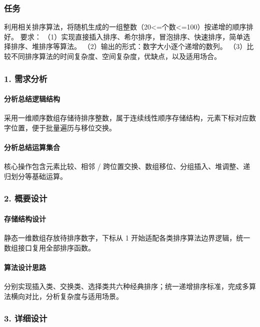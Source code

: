 \documentclass{ctexart}
\begin{document}
\subsubsection {任务}
利用相关排序算法，将随机生成的一组整数（20<=个数<=100）按递增的顺序排好。 要求： （1）实现直接插入排序、希尔排序，冒泡排序、快速排序，简单选择排序、堆排序等算法。 （2）输出的形式：数字大小逐个递增的数列。 （3）比较不同排序算法的时间复杂度、空间复杂度，优缺点，以及适用场合。
\subsubsection{1. 需求分析}
\paragraph{分析总结逻辑结构}
采用一维顺序数组存储待排序整数，属于连续线性顺序存储结构，元素下标对应数字位置，便于批量遍历与移位交换。
\paragraph{分析总结运算集合}
核心操作包含元素比较、相邻 / 跨位置交换、数组移位、分组插入、堆调整、递归划分等基础运算。
\subsubsection{2. 概要设计}
\paragraph{存储结构设计}
静态一维数组存放待排序数字，下标从 1 开始适配各类排序算法边界逻辑，统一数组接口复用全部排序函数。
\paragraph{算法设计思路}
分别实现插入类、交换类、选择类共六种经典排序；统一递增排序标准，完成多算法横向对比，分析复杂度与适用场景。
\subsubsection{3. 详细设计}
\end{document}
